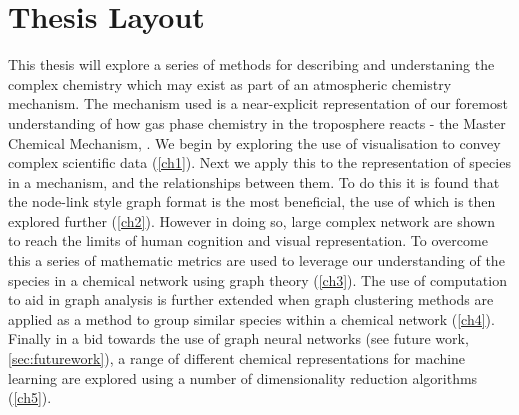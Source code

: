 


\section{Thesis Layout}
This thesis will explore a series of methods for describing and understaning the complex chemistry which may exist as part of an atmospheric chemistry mechanism. The mechanism used is a near-explicit representation of our foremost understanding of how gas phase chemistry in the troposphere reacts - the Master Chemical Mechanism, \citep{mcm}.
We begin by exploring the use of visualisation to convey complex scientific data (\autoref{ch1}). Next we apply this to the representation of species in a mechanism, and the relationships between them. To do this it is found that the node-link style graph format is the most beneficial, the use of which is then explored further (\autoref{ch2}).
However in doing so, large complex network are shown to reach the limits of human cognition and visual representation. To overcome this a series of mathematic metrics are used to leverage our understanding of the species in a chemical network using graph theory (\autoref{ch3}). The use of computation to aid in graph analysis is further extended when graph clustering methods are applied as a method to group similar species within a chemical network (\autoref{ch4}). Finally in a bid towards the use of graph neural networks (see future work, \autoref{sec:futurework}), a range of different chemical representations for machine learning are explored using a number of dimensionality reduction algorithms (\autoref{ch5}).
